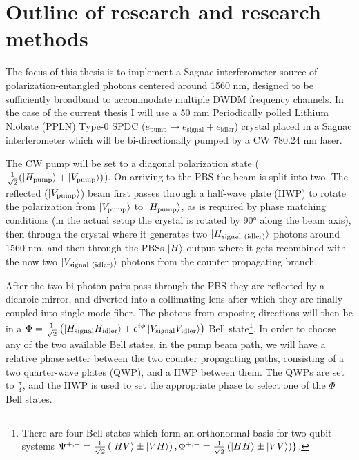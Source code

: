 \documentclass{article}
\begin{document}
\section{Outline of research and research methods} The focus of this thesis is
to implement a Sagnac interferometer source of polarization-entangled photons
centered around 1560 nm, designed to be sufficiently broadband to accommodate
multiple DWDM frequency channels. In the case of the current thesis I will use
a 50 mm Periodically polled Lithium Niobate (PPLN) Type-0 SPDC
($e_{\mathrm{pump}} \rightarrow e_{\mathrm{signal}} + e_{\mathrm{idler}}$)
crystal placed in a Sagnac interferometer which will be bi-directionally pumped
by a CW 780.24 nm laser. \par The CW pump will be set to a diagonal
polarization state ($\frac{1}{\sqrt{2}}(\ket{H_{\mathrm{pump}}} +
	\ket{V_{\mathrm{pump}}})$). On arriving to the PBS the beam is split into two.
The reflected ($\ket{V_{\mathrm{pump}}}$) beam first passes through a half-wave
plate (HWP) to rotate the polarization from $\ket{V_{\mathrm{pump}}}$ to
$\ket{H_{\mathrm{pump}}}$, as is required by phase matching conditions (in the
actual setup the crystal is rotated by 90° along the beam axis), then through
the crystal where it generates two $\ket{H_{\mathrm{signal}\
				(\mathrm{idler})}}$ photons around 1560 nm, and then through the PBSs $\ket{H}$
output where it gets recombined with the now two $\ket{V_{\mathrm{signal}\
				(\mathrm{idler})}}$ photons from the counter propagating branch.

After the two bi-photon pairs pass through the PBS they are reflected by a
dichroic mirror, and diverted into a collimating lens after which they are
finally coupled into single mode fiber. The photons from opposing directions
will then be in a $\Phi = \frac{1}{\sqrt{2}}\left(
	\ket{H_{\mathrm{signal}}H_{\mathrm{idler}}} + e^{i
		\phi}\ket{V_{\mathrm{signal}}V_{\mathrm{idler}}}\right)$ Bell
state\footnote{There are four Bell states which form an orthonormal basis for
	two qubit systems $\Psi^{+,-}=\frac{1}{\sqrt{2}}\left(\ket{HV} \pm
		\ket{VH}\right),\\\Phi^{+,-} = \frac{1}{\sqrt{2}} \left( \ket{HH} \pm \ket{VV}
		\right)\}$.}. In order to choose any of the two available Bell states, in the
pump beam path, we will have a relative phase setter between the two counter
propagating paths, consisting of a two quarter-wave plates (QWP), and a HWP
between them. The QWPs are set to $\frac{\pi}{4}$, and the HWP is used to set
the appropriate phase to select one of the $\Phi$ Bell states.
\end{document}
